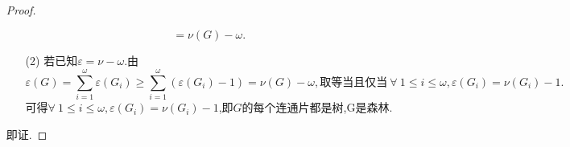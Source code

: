 \documentclass{article}
\begin{document}
\begin{enumerate}
\begin{proof}
\begin{enumerate}
\[                =\nu\left(G\right)-\omega.
            \]
            \item [(2)]若已知$\varepsilon=\nu-\omega$.由
            \[
                \varepsilon\left(G\right)
                =\sum\limits_{i=1}^{\omega} \varepsilon\left(G_{i}\right)
                \geqslant \sum\limits_{i=1}^{\omega} \left(\varepsilon\left(G_{i}\right)-1 \right)
                =\nu\left(G\right)-\omega,
                \mbox{取等当且仅当}\ 
                \forall\ 1\leqslant i\leqslant \omega,\varepsilon\left(G_{i}\right)=\nu\left(G_{i}\right)-1.
            \]
            可得$\forall\ 1\leqslant i\leqslant \omega,\varepsilon\left(G_{i}\right)=\nu\left(G_{i}\right)-1$,即$G$的每个连通片都是树,G是森林.
        \end{enumerate}
        即证.
    \end{proof}
\end{enumerate}
\end{document}
